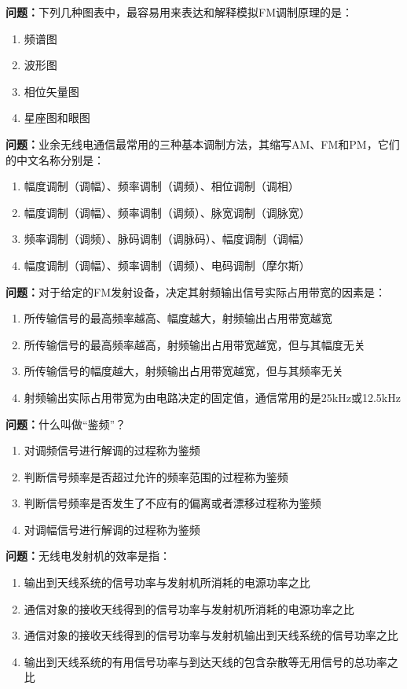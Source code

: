 \documentclass[UTF8]{ctexbook}
\begin{document}
\textbf{问题：}下列几种图表中，最容易用来表达和解释模拟FM调制原理的是：
\begin{enumerate}[label=\Alph*), leftmargin=3em]
  \item 频谱图
  \item 波形图
  \item 相位矢量图
  \item 星座图和眼图
\end{enumerate}

\textbf{问题：}业余无线电通信最常用的三种基本调制方法，其缩写AM、FM和PM，它们的中文名称分别是：
\begin{enumerate}[label=\Alph*), leftmargin=3em]
  \item 幅度调制（调幅）、频率调制（调频）、相位调制（调相）
  \item 幅度调制（调幅）、频率调制（调频）、脉宽调制（调脉宽）
  \item 频率调制（调频）、脉码调制（调脉码）、幅度调制（调幅）
  \item 幅度调制（调幅）、频率调制（调频）、电码调制（摩尔斯）
\end{enumerate}

\textbf{问题：}对于给定的FM发射设备，决定其射频输出信号实际占用带宽的因素是：
\begin{enumerate}[label=\Alph*), leftmargin=3em]
  \item 所传输信号的最高频率越高、幅度越大，射频输出占用带宽越宽
  \item 所传输信号的最高频率越高，射频输出占用带宽越宽，但与其幅度无关
  \item 所传输信号的幅度越大，射频输出占用带宽越宽，但与其频率无关
  \item 射频输出实际占用带宽为由电路决定的固定值，通信常用的是25kHz或12.5kHz
\end{enumerate}

\textbf{问题：}什么叫做“鉴频”？
\begin{enumerate}[label=\Alph*), leftmargin=3em]
  \item 对调频信号进行解调的过程称为鉴频
  \item 判断信号频率是否超过允许的频率范围的过程称为鉴频
  \item 判断信号频率是否发生了不应有的偏离或者漂移过程称为鉴频
  \item 对调幅信号进行解调的过程称为鉴频
\end{enumerate}

\textbf{问题：}无线电发射机的效率是指：
\begin{enumerate}[label=\Alph*), leftmargin=3em]
  \item 输出到天线系统的信号功率与发射机所消耗的电源功率之比
  \item 通信对象的接收天线得到的信号功率与发射机所消耗的电源功率之比
  \item 通信对象的接收天线得到的信号功率与发射机输出到天线系统的信号功率之比
  \item 输出到天线系统的有用信号功率与到达天线的包含杂散等无用信号的总功率之比
\end{enumerate}
\end{document}
